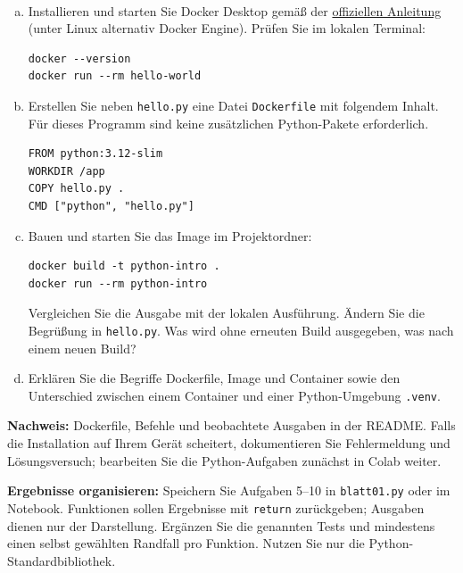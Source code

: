 \\
\begin{enumerate}[a)]
\item Installieren und starten Sie Docker Desktop gemäß der
\href{https://docs.docker.com/get-started/get-docker/}{offiziellen Anleitung}
(unter Linux alternativ Docker Engine). Prüfen Sie im lokalen Terminal:
\begin{lstlisting}[language={}]
docker --version
docker run --rm hello-world
\end{lstlisting}
\item Erstellen Sie neben \texttt{hello.py} eine Datei \texttt{Dockerfile} mit folgendem Inhalt.
Für dieses Programm sind keine zusätzlichen Python-Pakete erforderlich.
\begin{lstlisting}[language={}]
FROM python:3.12-slim
WORKDIR /app
COPY hello.py .
CMD ["python", "hello.py"]
\end{lstlisting}
\item Bauen und starten Sie das Image im Projektordner:
\begin{lstlisting}[language={}]
docker build -t python-intro .
docker run --rm python-intro
\end{lstlisting}
Vergleichen Sie die Ausgabe mit der lokalen Ausführung. Ändern Sie die Begrüßung in
\texttt{hello.py}. Was wird ohne erneuten Build ausgegeben, was nach einem neuen Build?
\item Erklären Sie die Begriffe Dockerfile, Image und Container sowie den Unterschied
zwischen einem Container und einer Python-Umgebung \texttt{.venv}.
\end{enumerate}
\textbf{Nachweis:} Dockerfile, Befehle und beobachtete Ausgaben in der README.
Falls die Installation auf Ihrem Gerät scheitert, dokumentieren Sie Fehlermeldung und
Lösungsversuch; bearbeiten Sie die Python-Aufgaben zunächst in Colab weiter.

\begin{notes}
\textbf{Ergebnisse organisieren:} Speichern Sie Aufgaben 5--10 in \texttt{blatt01.py}
oder im Notebook. Funktionen sollen Ergebnisse mit \texttt{return} zurückgeben;
Ausgaben dienen nur der Darstellung. Ergänzen Sie die genannten Tests und mindestens
einen selbst gewählten Randfall pro Funktion. Nutzen Sie nur die Python-Standardbibliothek.
\end{notes}

